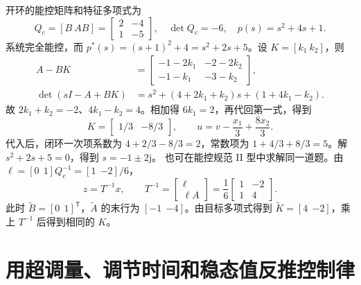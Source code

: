 \sol 开环的能控矩阵和特征多项式为
\[
    Q_c=[B\ AB]=\begin{bmatrix}2&-4\\1&-5\end{bmatrix},\quad
    \det Q_c=-6,\quad p(s)=s^2+4s+1 .
\]
系统完全能控，而 $p^\ast(s)=(s+1)^2+4=s^2+2s+5$。设 $K=[k_1\ k_2]$，则
\[
\begin{aligned}
    A-BK&=\begin{bmatrix}-1-2k_1&-2-2k_2\\-1-k_1&-3-k_2\end{bmatrix},\\
    \det(sI-A+BK)&=s^2+(4+2k_1+k_2)s+(1+4k_1-k_2).
\end{aligned}
\]
故 $2k_1+k_2=-2$、$4k_1-k_2=4$。相加得 $6k_1=2$，再代回第一式，得到
\[
    \boxed{K=\begin{bmatrix}1/3&-8/3\end{bmatrix}},\qquad
    u=v-\frac{x_1}{3}+\frac{8x_2}{3}.
\]
代入后，闭环一次项系数为 $4+2/3-8/3=2$，常数项为 $1+4/3+8/3=5$。解 $s^2+2s+5=0$，得到 $s=-1\pm2\mathrm j$。
也可在能控规范 II 型中求解同一道题。由 $\ell=[0\ \ 1]Q_c^{-1}=[1\ \ {-2}]/6$，
\[
    z=T^{-1}x,\qquad T^{-1}=\begin{bmatrix}\ell\\ \ell A\end{bmatrix}
          =\frac16\begin{bmatrix}1&-2\\1&4\end{bmatrix}.
\]
此时 $\widetilde B=[0\ \ 1]^{\mathsf T}$，$\widetilde A$ 的末行为 $[-1\ \ {-4}]$。由目标多项式得到 $\widetilde K=[4\ \ {-2}]$，乘上 $T^{-1}$ 后得到相同的 $K$。

\section{用超调量、调节时间和稳态值反推控制律}

